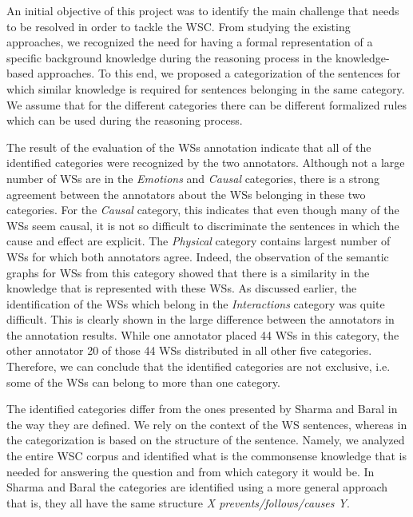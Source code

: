 
An initial objective of this project was to identify the main challenge that needs to be resolved in order to tackle the WSC.
From studying the existing approaches, we recognized the need for having a formal representation of a specific background knowledge during the reasoning process in the knowledge-based approaches. To this end, we proposed a categorization of the sentences for which similar knowledge is required for sentences belonging in the same category. We assume that for the different categories there can be different formalized rules which can be used during the reasoning process. 


The result of the evaluation of the WSs annotation indicate that all of the identified categories were recognized by the two annotators. Although not a large number of WSs are in the \textit{Emotions} and \textit{Causal} categories, there is a strong agreement between the annotators about the WSs belonging in these two categories. For the \textit{Causal} category, this indicates that even though many of the WSs seem causal, it is not so difficult to discriminate the sentences in which the cause and effect are explicit. The \textit{Physical} category contains largest number of WSs for which both annotators agree. Indeed, the observation of the semantic graphs for WSs from this category showed that there is a similarity in the knowledge that is represented with these WSs. As discussed earlier, the identification of the WSs which belong in the \textit{Interactions} category was quite difficult. This is clearly shown in the large difference between the annotators in the annotation results. While one annotator placed 44 WSs in this category, the other annotator 20 of those 44 WSs distributed in all other five categories. Therefore, we can conclude that the identified categories are not exclusive, i.e. some of the WSs can belong to more than one category. 


The identified categories differ from the ones presented by Sharma and Baral \cite{2018CommonsenseKT} in the way they are defined. We rely on the context of the WS sentences, whereas in \cite{2018CommonsenseKT} the categorization is based on the structure of the sentence. Namely, we analyzed the entire WSC corpus and identified what is the commonsense knowledge that is needed for answering the question and from which category it would be. In Sharma and Baral \cite{2018CommonsenseKT} the categories are identified using a more general approach that is, they all have the same structure \textit{X prevents/follows/causes Y}. 

